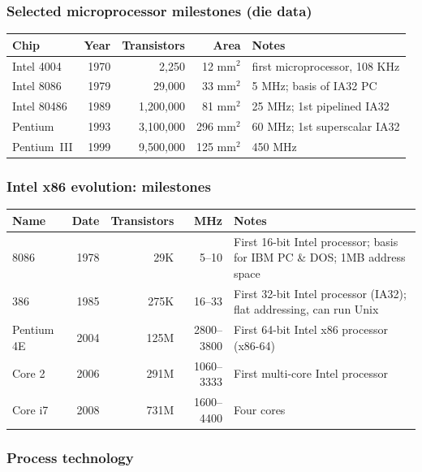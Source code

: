 \subsubsection{Selected microprocessor milestones (die data)}

\begin{center}
\begin{tabular}{@{}lrrrl@{}}
\toprule
Chip & Year & Transistors & Area & Notes \\
\midrule
Intel 4004      & 1970 & 2,250      & 12 mm$^2$  & first microprocessor, 108 KHz \\
Intel 8086      & 1979 & 29,000     & 33 mm$^2$  & 5 MHz; basis of IA32 PC \\
Intel 80486     & 1989 & 1,200,000  & 81 mm$^2$  & 25 MHz; 1st pipelined IA32 \\
Pentium         & 1993 & 3,100,000  & 296 mm$^2$ & 60 MHz; 1st superscalar IA32 \\
Pentium~III     & 1999 & 9,500,000  & 125 mm$^2$ & 450 MHz \\
\bottomrule
\end{tabular}
\end{center}

\subsubsection{Intel x86 evolution: milestones}

\begin{center}
\begin{tabular}{@{}lrrrp{6cm}@{}}
\toprule
Name & Date & Transistors & MHz & Notes \\
\midrule
8086     & 1978 & 29K   & 5--10     & First 16-bit Intel processor; basis for IBM PC \& DOS; 1MB address space \\
386      & 1985 & 275K  & 16--33    & First 32-bit Intel processor (IA32); flat addressing, can run Unix \\
Pentium 4E & 2004 & 125M & 2800--3800 & First 64-bit Intel x86 processor (x86-64) \\
Core 2   & 2006 & 291M  & 1060--3333 & First multi-core Intel processor \\
Core i7  & 2008 & 731M  & 1600--4400 & Four cores \\
\bottomrule
\end{tabular}
\end{center}

\subsubsection{Process technology}

